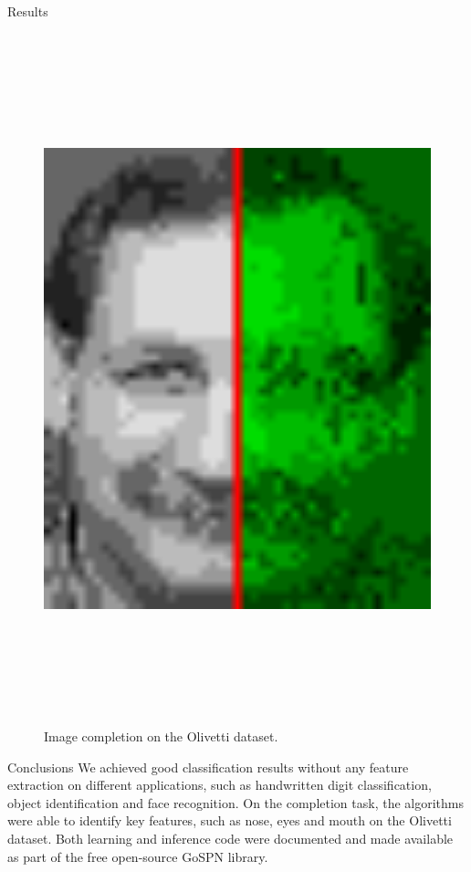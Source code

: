 \documentclass[final,hyperref={pdfpagelabels=false},notheorems]{beamer}
\theoremstyle{thesisstyle}
\begin{document}
\begin{frame}[t]
\begin{columns}[t]
\begin{column}{.505\textwidth}
\begin{block}{Results}
\begin{figure}[h]
        \includegraphics[height=20cm]{imgs/dennis_cmpl.png}
        \caption{Image completion on the Olivetti dataset.}
      \end{figure}
    \end{block}

    \begin{block}{Conclusions}
      We achieved good classification results without any feature extraction on different
      applications, such as handwritten digit classification, object identification and face
      recognition. On the completion task, the algorithms were able to identify key features, such
      as nose, eyes and mouth on the Olivetti dataset. Both learning and inference code were
      documented and made available as part of the free open-source GoSPN library.
    \end{block}


\end{column}
\end{columns}
\end{frame}
\end{document}
